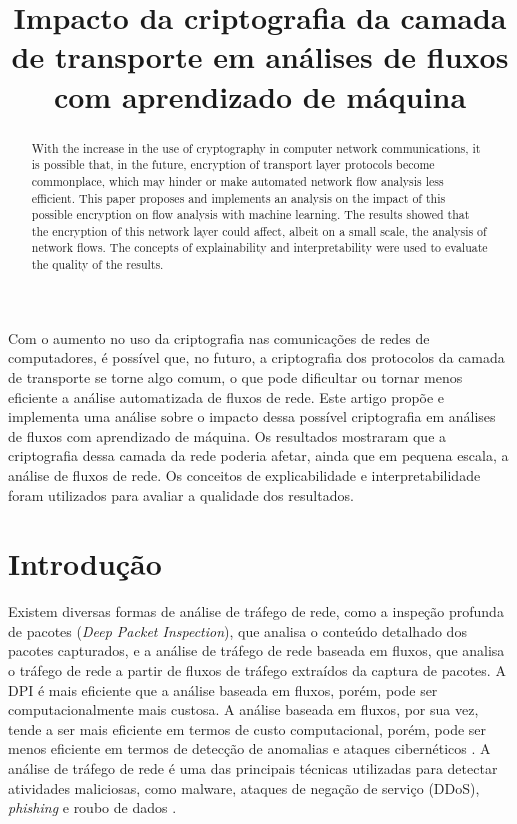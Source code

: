 \documentclass[12pt]{article}
\title{Impacto da criptografia da camada de transporte em análises de fluxos com aprendizado de máquina}
\author{
}
\begin{document}
\maketitle

\begin{abstract}
    With the increase in the use of cryptography in computer network communications, it is possible that, in the future, encryption of transport layer protocols become commonplace, which may hinder or make automated network flow analysis less efficient. This paper proposes and implements an analysis on the impact of this possible encryption on flow analysis with machine learning. The results showed that the encryption of this network layer could affect, albeit on a small scale, the analysis of network flows. The concepts of explainability and interpretability were used to evaluate the quality of the results.
\end{abstract}

\begin{resumo}
    Com o aumento no uso da criptografia nas comunicações de redes de computadores, é possível que, no futuro, a criptografia dos protocolos da camada de transporte se torne algo comum, o que pode dificultar ou tornar menos eficiente a análise automatizada de fluxos de rede. Este artigo propõe e implementa uma análise sobre o impacto dessa possível criptografia em análises de fluxos com aprendizado de máquina. Os resultados mostraram que a criptografia dessa camada da rede poderia afetar, ainda que em pequena escala, a análise de fluxos de rede. Os conceitos de explicabilidade e interpretabilidade foram utilizados para avaliar a qualidade dos resultados.
\end{resumo}


\section{Introdução}
\label{cap:introducao}

Existem diversas formas de análise de tráfego de rede, como a inspeção profunda de pacotes (\emph{Deep Packet Inspection}), que analisa o conteúdo detalhado dos pacotes capturados, e a análise de tráfego de rede baseada em fluxos, que analisa o tráfego de rede a partir de fluxos de tráfego extraídos da captura de pacotes. A DPI é mais eficiente que a análise baseada em fluxos, porém, pode ser computacionalmente mais custosa. A análise baseada em fluxos, por sua vez, tende a ser mais eficiente em termos de custo computacional, porém, pode ser menos eficiente em termos de detecção de anomalias e ataques cibernéticos \cite{boukhtouta2016network}.
A análise de tráfego de rede é uma das principais técnicas utilizadas para detectar atividades maliciosas, como malware, ataques de negação de serviço (DDoS), \emph{phishing} e roubo de dados \cite{joshi2015review}.
\end{document}
